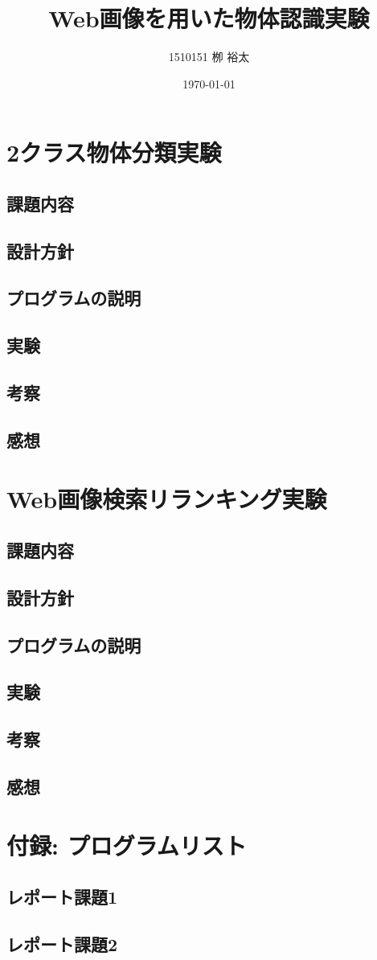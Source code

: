 \documentclass[11pt,a4paper, uplatex]{jsreport}
\title{Web画像を用いた物体認識実験}
\author{1510151  栁 裕太}
\date{\today}
\begin{document}
\maketitle
\thispagestyle{empty}
\tableofcontents
\chapter{2クラス物体分類実験}
\section{課題内容}
\section{設計方針}
\section{プログラムの説明}
\section{実験}
\section{考察}
\section{感想}
\chapter{Web画像検索リランキング実験}
\section{課題内容}
\section{設計方針}
\section{プログラムの説明}
\section{実験}
\section{考察}
\section{感想}

\chapter{付録: プログラムリスト}
\section{レポート課題1}
\section{レポート課題2}
\end{document}
